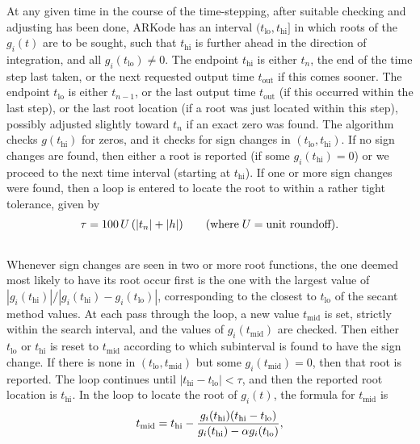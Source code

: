 \documentclass[letterpaper,10pt,english]{sphinxmanual}
\begin{document}
At any given time in the course of the time-stepping, after suitable
checking and adjusting has been done, ARKode has an interval
$(t_\text{lo}, t_\text{hi}]$ in which roots of the $g_i(t)$ are to
be sought, such that $t_\text{hi}$ is further ahead in the direction
of integration, and all $g_i(t_\text{lo}) \ne 0$. The endpoint
$t_\text{hi}$ is either $t_n$, the end of the time step last
taken, or the next requested output time $t_\text{out}$ if this comes
sooner. The endpoint $t_\text{lo}$ is either $t_{n-1}$, or the
last output time $t_\text{out}$ (if this occurred within the last
step), or the last root location (if a root was just located within
this step), possibly adjusted slightly toward $t_n$ if an exact
zero was found. The algorithm checks $g(t_\text{hi})$ for zeros, and
it checks for sign changes in $(t_\text{lo}, t_\text{hi})$. If no sign
changes are found, then either a root is reported (if some
$g_i(t_\text{hi}) = 0$) or we proceed to the next time interval
(starting at $t_\text{hi}$). If one or more sign changes were found,
then a loop is entered to locate the root to within a rather tight
tolerance, given by
\begin{gather}
\begin{split}\tau = 100\, U\, (|t_n| + |h|)\qquad (\text{where}\; U = \text{unit roundoff}).\end{split}\notag\\\begin{split}\end{split}\notag
\end{gather}
Whenever sign changes are seen in two or more root functions, the one
deemed most likely to have its root occur first is the one with the
largest value of
$\left|g_i(t_\text{hi})\right| / \left| g_i(t_\text{hi}) - g_i(t_\text{lo})\right|$,
corresponding to the closest to $t_\text{lo}$ of the secant method
values. At each pass through the loop, a new value $t_\text{mid}$ is
set, strictly within the search interval, and the values of
$g_i(t_\text{mid})$ are checked. Then either $t_\text{lo}$ or
$t_\text{hi}$ is reset to $t_\text{mid}$ according to which
subinterval is found to have the sign change. If there is none in
$(t_\text{lo}, t_\text{mid})$ but some $g_i(t_\text{mid}) = 0$, then that
root is reported. The loop continues until $\left|t_\text{hi} -
t_\text{lo} \right| < \tau$, and then the reported root location is
$t_\text{hi}$.  In the loop to locate the root of $g_i(t)$, the
formula for $t_\text{mid}$ is
\begin{gather}
\begin{split}t_\text{mid} = t_\text{hi} -
\frac{g_i(t_\text{hi}) (t_\text{hi} - t_\text{lo})}{g_i(t_\text{hi}) - \alpha g_i(t_\text{lo})} ,\end{split}\notag\\\begin{split}\end{split}\notag
\end{gather}
\end{document}
